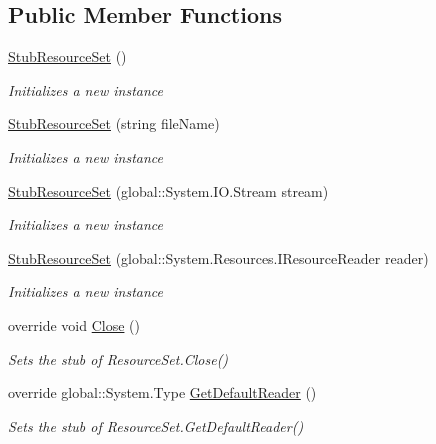 \subsection*{Public Member Functions}
\begin{DoxyCompactItemize}
\item 
\hyperlink{class_system_1_1_resources_1_1_fakes_1_1_stub_resource_set_afab110b51e57225945c9b497ab6810e2}{Stub\-Resource\-Set} ()
\begin{DoxyCompactList}\small\item\em Initializes a new instance\end{DoxyCompactList}\item 
\hyperlink{class_system_1_1_resources_1_1_fakes_1_1_stub_resource_set_a4d2f833670278f14a879acfb295d0951}{Stub\-Resource\-Set} (string file\-Name)
\begin{DoxyCompactList}\small\item\em Initializes a new instance\end{DoxyCompactList}\item 
\hyperlink{class_system_1_1_resources_1_1_fakes_1_1_stub_resource_set_aaea3ce507cbf477aa23e8c1bca4cae07}{Stub\-Resource\-Set} (global\-::\-System.\-I\-O.\-Stream stream)
\begin{DoxyCompactList}\small\item\em Initializes a new instance\end{DoxyCompactList}\item 
\hyperlink{class_system_1_1_resources_1_1_fakes_1_1_stub_resource_set_ae087fe06002612b5161702580cc03b6f}{Stub\-Resource\-Set} (global\-::\-System.\-Resources.\-I\-Resource\-Reader reader)
\begin{DoxyCompactList}\small\item\em Initializes a new instance\end{DoxyCompactList}\item 
override void \hyperlink{class_system_1_1_resources_1_1_fakes_1_1_stub_resource_set_a51b6e9731f1674c6ac29b3183e8741dd}{Close} ()
\begin{DoxyCompactList}\small\item\em Sets the stub of Resource\-Set.\-Close()\end{DoxyCompactList}\item 
override global\-::\-System.\-Type \hyperlink{class_system_1_1_resources_1_1_fakes_1_1_stub_resource_set_a6e9a0aacb0eb44ac58a1d9b22fdb76ca}{Get\-Default\-Reader} ()
\begin{DoxyCompactList}\small\item\em Sets the stub of Resource\-Set.\-Get\-Default\-Reader()\end{DoxyCompactList}\item 

\end{DoxyCompactItemize}
